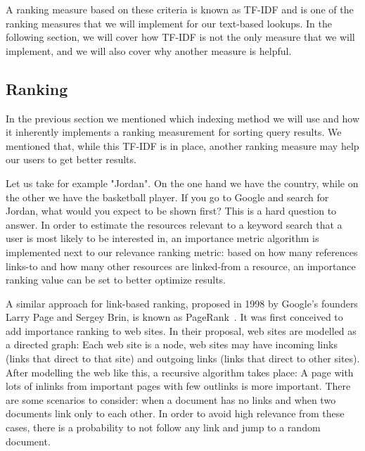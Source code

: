 A ranking measure based on these criteria is known as TF-IDF and is one of the ranking measures that we will implement for our text-based lookups. In the following section, we will cover how TF-IDF is not the only measure that we will implement, and we will also cover why another measure is helpful.


\subsection{Ranking}
\label{chap:pagerank}

In the previous section we mentioned which indexing method we will use and how it inherently implements a ranking measurement for sorting query results. We mentioned that, while this TF-IDF is in place, another ranking measure may help our users to get better results.

Let us take for example "Jordan". On the one hand we have the country, while on the other we have the basketball player. If you go to Google and search for Jordan, what would you expect to be shown first? This is a hard question to answer. In order to estimate the resources relevant to a keyword search that a user is most likely to be interested in, an importance metric algorithm is implemented next to our relevance ranking metric: based on how many references links-to and how many other resources are linked-from a resource, an importance ranking value can be set to better optimize results.

A similar approach for link-based ranking, proposed in 1998 by Google's founders Larry Page and Sergey Brin, is known as PageRank~\cite{Page1998}. It was first conceived to add importance ranking to web sites. In their proposal, web sites are modelled as a directed graph: Each web site is a node, web sites may have incoming links (links that direct to that site) and outgoing links (links that direct to other sites). After modelling the web like this, a recursive algorithm takes place: A page with lots of inlinks from important pages with few outlinks is more important. There are some scenarios to consider: when a document has no links and when two documents link only to each other. In order to avoid high relevance from these cases, there is a probability to not follow any link and jump to a random document.

